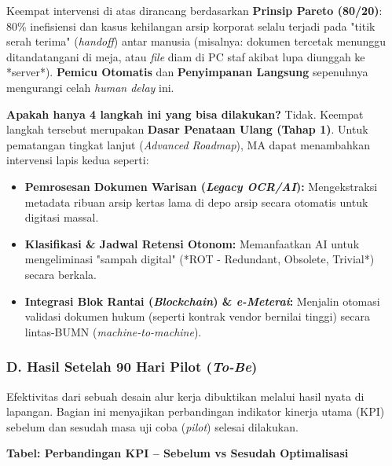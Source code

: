 \documentclass[12pt,a4paper]{report}
\begin{document}
\begin{plnbox}
\small
Keempat intervensi di atas dirancang berdasarkan \textbf{Prinsip Pareto (80/20)}: 80\% inefisiensi dan kasus kehilangan arsip korporat selalu terjadi pada "titik serah terima" (\textit{handoff}) antar manusia (misalnya: dokumen tercetak menunggu ditandatangani di meja, atau \textit{file} diam di PC staf akibat lupa diunggah ke *server*). \textbf{Pemicu Otomatis} dan \textbf{Penyimpanan Langsung} sepenuhnya mengurangi celah \textit{human delay} ini. 

\textbf{Apakah hanya 4 langkah ini yang bisa dilakukan?} Tidak. Keempat langkah tersebut merupakan \textbf{Dasar Penataan Ulang (Tahap 1)}. Untuk pematangan tingkat lanjut (\textit{Advanced Roadmap}), MA dapat menambahkan intervensi lapis kedua seperti:
\begin{itemize}[nosep, leftmargin=*]
    \item \textbf{Pemrosesan Dokumen Warisan (\textit{Legacy OCR/AI}):} Mengekstraksi metadata ribuan arsip kertas lama di depo arsip secara otomatis untuk digitasi massal.
    \item \textbf{Klasifikasi \& Jadwal Retensi Otonom:} Memanfaatkan AI untuk mengeliminasi "sampah digital" (*ROT - Redundant, Obsolete, Trivial*) secara berkala.
    \item \textbf{Integrasi Blok Rantai (\textit{Blockchain}) \& \textit{e-Meterai}:} Menjalin otomasi validasi dokumen hukum (seperti kontrak vendor bernilai tinggi) secara lintas-BUMN (\textit{machine-to-machine}).
\end{itemize}
\end{plnbox}

\subsubsection*{D. Hasil Setelah 90 Hari Pilot (\textit{To-Be})}
Efektivitas dari sebuah desain alur kerja dibuktikan melalui hasil nyata di lapangan. Bagian ini menyajikan perbandingan indikator kinerja utama (KPI) sebelum dan sesudah masa uji coba (\textit{pilot}) selesai dilakukan.

\vspace{0.3cm}
\noindent
{\small\bfseries Tabel: Perbandingan KPI -- Sebelum vs Sesudah Optimalisasi}
\end{document}
